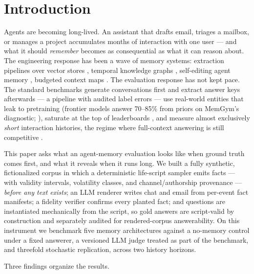 \section{Introduction}
\label{sec:intro}

Agents are becoming long-lived. An assistant that drafts email, triages a
mailbox, or manages a project accumulates months of interaction with one user
--- and what it should \emph{remember} becomes as consequential as what it
can reason about. The engineering response has been a wave of memory systems:
extraction pipelines over vector stores \citep{chhikara2025mem0}, temporal
knowledge graphs \citep{rasmussen2025zep}, self-editing agent memory
\citep{packer2023memgpt}, budgeted context maps \citep{gu2026peek}. The
evaluation response has not kept pace. The standard benchmarks generate
conversations first and extract answer keys afterwards --- a pipeline with
audited label errors \citep[6.4\% of LoCoMo's answer
key;][]{penfield2026locomoaudit,northcutt2021labelerrors} --- use real-world
entities that leak to pretraining (frontier models answer 70--85\% from
priors on MemGym's diagnostic; \citealp{xu2026memgym}), saturate at the top
of leaderboards \citep{he2026memoryarena}, and measure almost exclusively
\emph{short} interaction histories, the regime where full-context answering
is still competitive \citep{convomem2025}.

This paper asks what an agent-memory evaluation looks like when ground truth
comes first, and what it reveals when it runs long. We built a fully
synthetic, fictionalized corpus in which a deterministic life-script sampler
emits facts --- with validity intervals, volatility classes, and
channel/authorship provenance --- \emph{before any text exists}; an LLM
renderer writes chat and email from per-event fact manifests; a fidelity
verifier confirms every planted fact; and questions are instantiated
mechanically from the script, so gold answers are script-valid by
construction and separately audited for rendered-corpus answerability.
On this instrument we benchmark five memory architectures against a
no-memory control under a fixed answerer, a versioned LLM judge treated as
part of the benchmark, and threefold stochastic replication, across two history
horizons.

Three findings organize the results.

